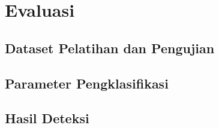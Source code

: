 \chapter{Evaluasi}
\label{bab:04}


	\section{Dataset Pelatihan dan Pengujian}
	\label{bab:04:dataset}
	

	\section{Parameter Pengklasifikasi}
	\label{bab:04:parameter}
	

	\section{Hasil Deteksi}
	\label{bab:04:hasil_deteksi}
	
